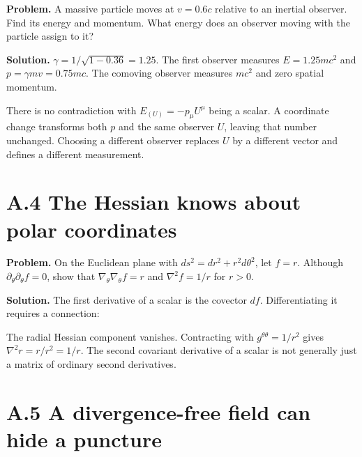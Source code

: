 \documentclass[
  11pt,
  letterpaper,
  oneside,
  openany]{scrbook}
\begin{document}
\textbf{Problem.} A massive particle moves at \(v=0.6c\) relative to an
inertial observer. Find its energy and momentum. What energy does an
observer moving with the particle assign to it?

\textbf{Solution.} \(\gamma=1/\sqrt{1-0.36}=1.25\). The first observer
measures \(E=1.25mc^2\) and \(p=\gamma mv=0.75mc\). The comoving
observer measures \(mc^2\) and zero spatial momentum.

There is no contradiction with \(E_{(U)}=-p_\mu U^\mu\) being a scalar.
A coordinate change transforms both \(p\) and the same observer \(U\),
leaving that number unchanged. Choosing a different observer replaces
\(U\) by a different vector and defines a different measurement.

\hypertarget{a.4-the-hessian-knows-about-polar-coordinates}{%
\section{A.4 The Hessian knows about polar
coordinates}\label{a.4-the-hessian-knows-about-polar-coordinates}}

\textbf{Problem.} On the Euclidean plane with
\(ds^2=dr^2+r^2d\theta^2\), let \(f=r\). Although
\(\partial_\theta\partial_\theta f=0\), show that
\(\nabla_\theta\nabla_\theta f=r\) and \(\nabla^2f=1/r\) for \(r>0\).

\textbf{Solution.} The first derivative of a scalar is the covector
\(df\). Differentiating it requires a connection:

\begin{center}
\begingroup
{}
\ifdim\wd\grmathbox>\linewidth
\resizebox{\linewidth}{!}{\usebox{\grmathbox}}
\else\usebox{\grmathbox}\fi
\endgroup
\end{center}

The radial Hessian component vanishes. Contracting with
\(g^{\theta\theta}=1/r^2\) gives \(\nabla^2r=r/r^2=1/r\). The second
covariant derivative of a scalar is not generally just a matrix of
ordinary second derivatives.

\hypertarget{a.5-a-divergence-free-field-can-hide-a-puncture}{%
\section{A.5 A divergence-free field can hide a
puncture}\label{a.5-a-divergence-free-field-can-hide-a-puncture}}
\end{document}
